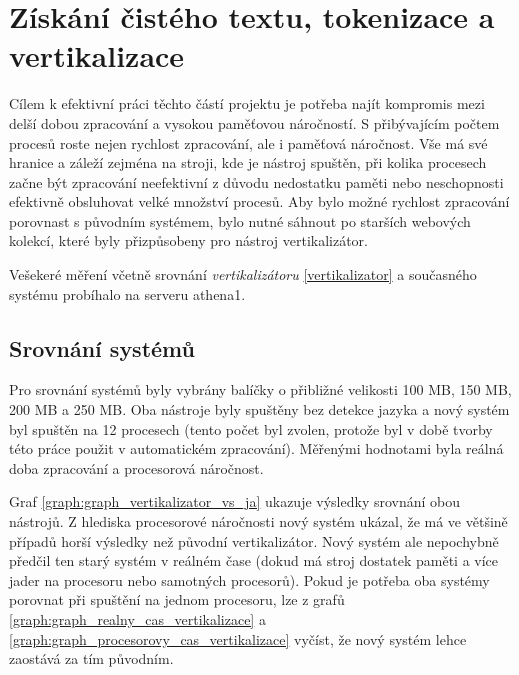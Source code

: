 \section{Získání čistého textu, tokenizace a vertikalizace}
Cílem k efektivní práci těchto částí projektu je potřeba najít kompromis mezi
delší dobou zpracování a vysokou paměťovou náročností. S přibývajícím
počtem procesů roste nejen rychlost zpracování, ale i paměťová náročnost. Vše má své hranice a
záleží zejména na stroji, kde je nástroj spuštěn, při kolika procesech začne být
zpracování neefektivní z důvodu nedostatku paměti nebo neschopnosti efektivně obsluhovat velké
množství procesů. Aby bylo možné rychlost zpracování porovnast s původním
systémem, bylo nutné sáhnout po starších webových kolekcí, které byly přizpůsobeny pro
nástroj vertikalizátor.

Vešekeré měření včetně srovnání \textit{vertikalizátoru} \ref{vertikalizator} a současného systému probíhalo na
serveru athena1.

\subsection{Srovnání systémů}
Pro srovnání systémů byly vybrány balíčky o přibližné velikosti 100 MB, 150 MB,
200 MB a 250 MB. Oba nástroje byly spuštěny bez detekce jazyka a nový systém
byl spuštěn na 12 procesech (tento počet byl zvolen, protože byl v době tvorby této
práce použit v automatickém zpracování). Měřenými hodnotami byla reálná doba zpracování
a procesorová náročnost.

Graf \ref{graph:graph_vertikalizator_vs_ja} ukazuje výsledky srovnání obou nástrojů.
Z hlediska procesorové náročnosti nový systém ukázal, že má ve většině případů horší výsledky
než původní vertikalizátor. Nový systém ale nepochybně předčil ten starý systém v reálném
čase (dokud má stroj dostatek paměti a více jader na procesoru nebo samotných procesorů). Pokud
je potřeba oba systémy porovnat při spuštění na jednom procesoru, lze z grafů \ref{graph:graph_realny_cas_vertikalizace}
a \ref{graph:graph_procesorovy_cas_vertikalizace} vyčíst, že nový systém lehce zaostává
za tím původním.

